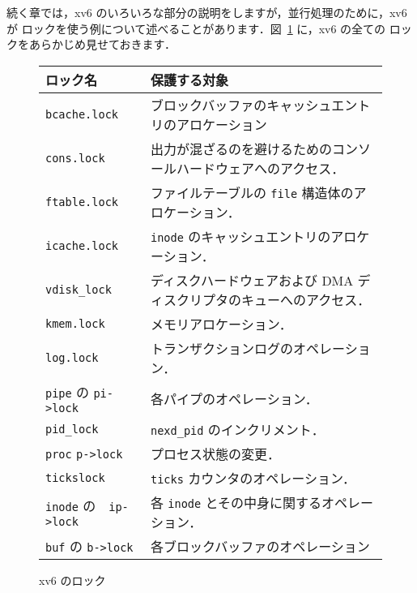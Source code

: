 続く章では，xv6 のいろいろな部分の説明をしますが，並行処理のために，xv6 が
ロックを使う例について述べることがあります．図~\ref{fig:locktable} に，xv6 の全ての
ロックをあらかじめ見せておきます．


\begin{figure}[t]
\center
{\footnotesize
  \begin{tabular}{ll} 
\textbf{ロック名} & \textbf{保護する対象} \\ \midrule
\texttt{bcache.lock} & ブロックバッファのキャッシュエントリのアロケーション\\
\texttt{cons.lock} & 出力が混ざるのを避けるためのコンソールハードウェアへのアクセス．\\ 
\texttt{ftable.lock} & ファイルテーブルの \texttt{file} 構造体のアロケーション．\\ 
\texttt{icache.lock} & \texttt{inode} のキャッシュエントリのアロケーション．\\ 
\texttt{vdisk\_lock} & ディスクハードウェアおよび DMA ディスクリプタのキューへのアクセス．\\ 
\texttt{kmem.lock} & メモリアロケーション．\\ 
\texttt{log.lock} & トランザクションログのオペレーション．\\
\texttt{pipe} の \texttt{pi->lock} & 各パイプのオペレーション．\\ 
\texttt{pid\_lock} & \texttt{nexd\_pid} のインクリメント．\\
\texttt{proc} \texttt{p->lock}  & プロセス状態の変更．\\
\texttt{tickslock}  & \texttt{ticks} カウンタのオペレーション．\\
\texttt{inode} の　\texttt{ip->lock} & 各 \texttt{inode} とその中身に関するオペレーション．\\
\texttt{buf} の \texttt{b->lock} & 各ブロックバッファのオペレーション\\ 
  \end{tabular}
}
\caption{xv6 のロック}
\label{fig:locktable}
\end{figure}

